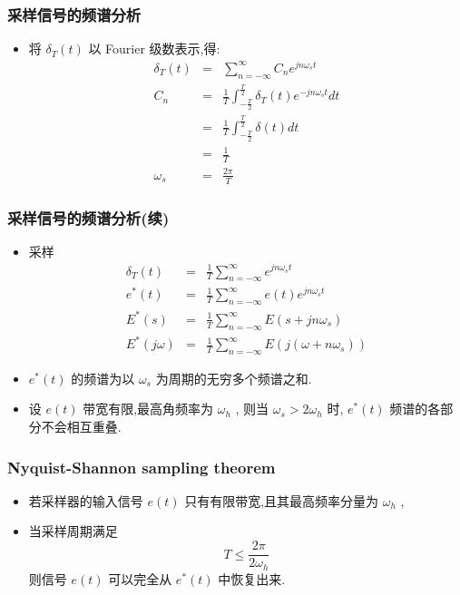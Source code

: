 \documentclass[table]{beamer}
\begin{document}
\begin{frame}
\frametitle{采样信号的频谱分析}
\label{sec-1-3}

\begin{itemize}
\item <2->将  $\delta_T(t)$  以 Fourier 级数表示,得: 
      \begin{eqnarray*}
      \delta_T(t) & = &\sum_{n=-\infty}^{\infty}C_n e^{jn\omega_s t} \\
      C_n &=&\frac{1}{T}\int_{-\frac{T}{2}}^{\frac{T}{2}}\delta_T(t)e^{-jn\omega_s t}dt \\
        &=&\frac{1}{T}\int_{-\frac{T}{2}}^{\frac{T}{2}}\delta(t)dt \\ 
        &=& \frac{1}{T} \\
      \omega_s &=& \frac{2\pi}{T} 
    \end{eqnarray*}
\end{itemize}
\end{frame}
\begin{frame}
\frametitle{采样信号的频谱分析(续)}
\label{sec-1-4}


\begin{itemize}
\item 采样
      \begin{eqnarray*}
      \delta_T(t) &=& \frac{1}{T}\sum_{n=-\infty}^{\infty}e^{jn\omega_s t} \\
      e^*(t) &=& \frac{1}{T}\sum_{n=-\infty}^{\infty}e(t)e^{jn\omega_s t} \\
      E^*(s) &=& \frac{1}{T}\sum_{n=-\infty}^{\infty}E(s+jn\omega_s ) \\
      E^*(j\omega) &=& \frac{1}{T}\sum_{n=-\infty}^{\infty}E(j(\omega+n\omega_s)) 
      \end{eqnarray*}
\item <2->$e^*(t)$  的频谱为以  $\omega_s$  为周期的无穷多个频谱之和.
\item <3->设  $e(t)$ 带宽有限,最高角频率为  $\omega_h$ , 则当  $\omega_s>2\omega_h$  时,  $e^*(t)$  频谱的各部分不会相互重叠.
\end{itemize}
\end{frame}
\begin{frame}
\frametitle{Nyquist-Shannon sampling theorem}
\label{sec-1-5}

\begin{itemize}
\item <2->若采样器的输入信号  $e(t)$ 只有有限带宽,且其最高频率分量为  $\omega_h$  ,
\item <3->当采样周期满足  
        \[T\leq\frac{2\pi}{2\omega_h}\]  
    则信号  $e(t)$  可以完全从  $e^*(t)$  中恢复出来.
\end{itemize}
\end{frame}
\end{document}
